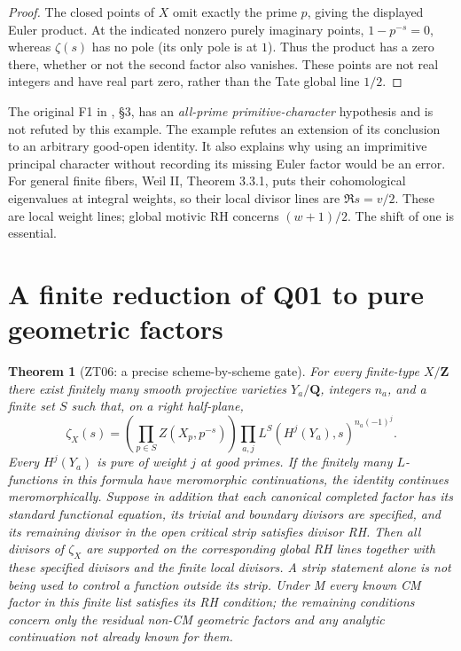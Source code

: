 \documentclass[11pt,a4paper]{article}
\newtheorem{theorem}{Theorem}[section]
\theoremstyle{definition}
\begin{document}
\begin{proof}
The closed points of $X$ omit exactly the prime $p$, giving the
displayed Euler product.  At the indicated nonzero purely imaginary
points, $1-p^{-s}=0$, whereas $\zeta(s)$ has no pole (its only pole
is at $1$).  Thus the product has a zero there, whether or not the
second factor also vanishes.  These points are not real integers
and have real part zero, rather than the Tate global line $1/2$.
\end{proof}

The original F1 in , \S3, has an
\emph{all-prime primitive-character} hypothesis and is not refuted
by this example.  The example refutes an extension of its conclusion
to an arbitrary good-open identity.  It also explains why using an
imprimitive principal character without recording its missing Euler
factor would be an error.  For general finite fibers, Weil II,
Theorem 3.3.1, puts their cohomological eigenvalues at integral weights,
so their local divisor lines are $\Re s=v/2$.  These are local
weight lines; global motivic RH concerns $(w+1)/2$.  The shift of
one is essential.

\section{A finite reduction of Q01 to pure geometric factors}
\label{sec:general-gate}

\begin{theorem}[ZT06: a precise scheme-by-scheme gate]\label{ZT06}
For every finite-type $X/\mathbf Z$ there exist finitely many smooth
projective varieties $Y_a/\mathbf Q$, integers $n_a$, and a finite
set $S$ such that, on a right half-plane,
\begin{equation}\label{eq:general-reduction}
 \zeta_X(s)=\left(\prod_{p\in S}Z(X_p,p^{-s})\right)
 \prod_{a,j} L^S(H^j(Y_a),s)^{n_a(-1)^j}.
\end{equation}
Every $H^j(Y_a)$ is pure of weight $j$ at good primes.  If the finitely
many $L$-functions in this formula have meromorphic continuations,
the identity continues meromorphically.  Suppose in addition that
each canonical completed factor has its standard functional equation,
its trivial and boundary divisors are specified, and its remaining
divisor in the open critical strip satisfies divisor RH.  Then all
divisors of $\zeta_X$ are supported on the corresponding global RH
lines together with these specified divisors and the finite local
divisors.  A strip statement alone is not being used to control a
function outside its strip.
Under M every known CM factor in this finite list satisfies its RH
condition; the remaining conditions concern only the residual
non-CM geometric factors and any analytic continuation not already
known for them.
\end{theorem}
\end{document}
